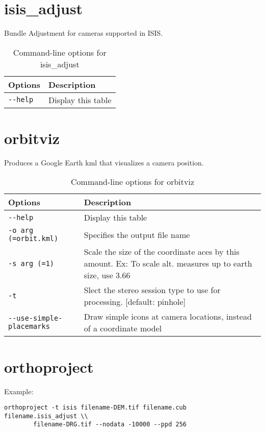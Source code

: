 \section{isis\_adjust}

Bundle Adjustment for cameras supported in ISIS.

\begin{longtable}{|l|p{10cm}|}
\caption{Command-line options for isis\_adjust}
\label{tbl:isise_adjust}
\endfirsthead
\endhead
\endfoot
\endlastfoot
\hline
Options & Description \\ \hline \hline
\verb#--help# & Display this table \\ \hline
\end{longtable}

\section{orbitviz}
\label{orbitviz}

Produces a Google Earth kml that visualizes a camera position.

\begin{longtable}{|l|p{10cm}|}
\caption{Command-line options for orbitviz}
\label{tbl:orbitviz}
\endfirsthead
\endhead
\endfoot
\endlastfoot
\hline
Options & Description \\ \hline \hline
\verb#--help# & Display this table \\ \hline
\verb#-o arg (=orbit.kml)# & Specifies the output file name \\ \hline
\verb#-s arg (=1)# & Scale the size of the coordinate aces by this amount. Ex: To scale alt. measures up to earth size, use 3.66 \\ \hline
\verb#-t# & Slect the stereo session type to use for processing. [default: pinhole] \\ \hline
\verb#--use-simple-placemarks# & Draw simple icons at camera locations, instead of a coordinate model \\ \hline
\end{longtable}

\section{orthoproject}
\label{orthoproject}

Example:
\begin{verbatim}
orthoproject -t isis filename-DEM.tif filename.cub filename.isis_adjust \\
        filename-DRG.tif --nodata -10000 --ppd 256
\end{verbatim}

